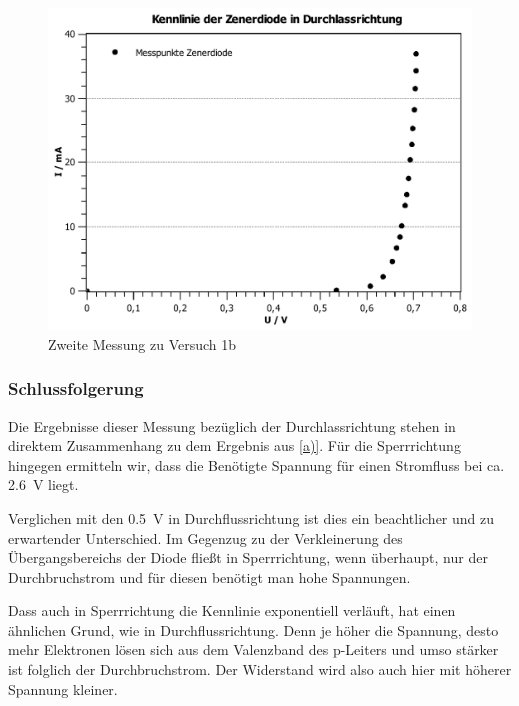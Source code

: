 \documentclass[11pt,a4paper,titlepage, ngerman]{article}
\begin{document}
\begin{itemize}
				 	\begin{figure}
				 		\centering
				 		\includegraphics[width=\textwidth]{KennlinieZenerdiodeDurchlassrichtung.pdf}
				 		\caption{Zweite Messung zu Versuch 1b}
				 		\label{KL b2}
				 	\end{figure}
				 					 	
				\end{itemize}
											
			\subsubsection{Schlussfolgerung}
				
				Die Ergebnisse dieser Messung bezüglich der Durchlassrichtung stehen in direktem Zusammenhang zu dem Ergebnis aus \ref{a)}. 
				Für die Sperrrichtung hingegen ermitteln wir, dass die Benötigte Spannung für einen Stromfluss bei ca. \SI{2.6}{\V} liegt. 
				
				Verglichen mit den \SI{0.5}{\V} in Durchflussrichtung ist dies ein beachtlicher und zu erwartender Unterschied. Im Gegenzug zu der Verkleinerung des Übergangsbereichs der Diode fließt in Sperrrichtung, wenn überhaupt, nur der Durchbruchstrom und für diesen benötigt man hohe Spannungen. 
				
				Dass auch in Sperrrichtung die Kennlinie exponentiell verläuft, hat einen ähnlichen Grund, wie in Durchflussrichtung. Denn je höher die Spannung, desto mehr Elektronen lösen sich aus dem Valenzband des p-Leiters und umso stärker ist folglich der Durchbruchstrom. Der Widerstand wird also auch hier mit höherer Spannung kleiner. 
				
\end{document}
